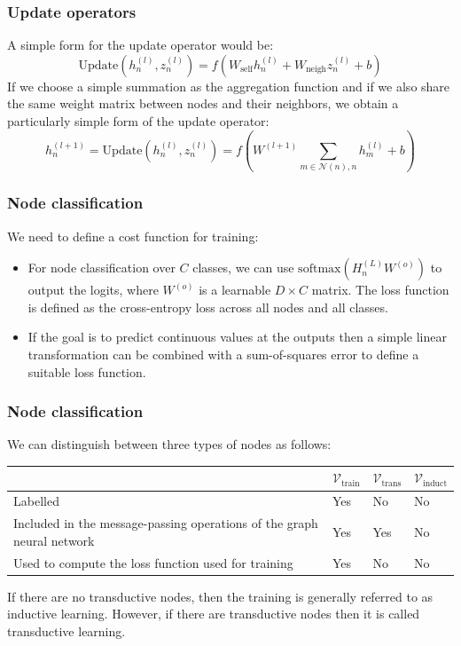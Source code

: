 \documentclass{beamer}
\begin{document}
\begin{frame}
    \frametitle{Update operators}
    A simple form for the update operator would be:
    \begin{equation*}
        \mathrm{Update}(h^{(l)}_{n},z^{(l)}_{n})=f(W_{\textrm{self}}h^{(l)}_{n}+W_{\textrm{neigh}}z^{(l)}_{n}+b)
    \end{equation*}
    If we choose a simple summation as the aggregation function and if we also share the same weight matrix between nodes and their neighbors, we obtain a particularly simple form of the update operator:
    \begin{equation*}
        h^{(l+1)}_{n}=\mathrm{Update}(h^{(l)}_{n},z^{(l)}_{n})=f(W^{(l+1)}\sum_{m\in\mathcal{N}(n),n}h^{(l)}_{m}+b)
    \end{equation*}
\end{frame}

\begin{frame}
    \frametitle{Node classification}
    We need to define a cost function for training:
    \begin{itemize}
        \item For node classification over $C$ classes, we can use $\mathrm{softmax}(H^{(L)}_{n}W^{(o)})$ to output the logits, where $W^{(o)}$ is a learnable $D\times{}C$ matrix. The loss function is defined as the cross-entropy loss across all nodes and all classes.
        \item If the goal is to predict continuous values at the outputs then a simple linear transformation can be combined with a sum-of-squares error to define a suitable loss function.
    \end{itemize}
\end{frame}

\begin{frame}
    \frametitle{Node classification}
    We can distinguish between three types of nodes as follows:
    \bigbreak
    \begin{tabular}{m{15em}|m{3em} m{3em} m{3em}}
        &$\mathcal{V}_{\textrm{train}}$&$\mathcal{V}_{\textrm{trans}}$&$\mathcal{V}_{\textrm{induct}}$ \\
        \hline
        Labelled&Yes&No&No \\
        \hline
        Included in the message-passing operations of the graph neural network&Yes&Yes&No \\
        \hline
        Used to compute the loss function used for training&Yes&No&No
    \end{tabular}
    \bigbreak
    If there are no transductive nodes, then the training is generally referred to as inductive learning. However, if there are transductive nodes then it is called transductive learning.
\end{frame}
\end{document}
